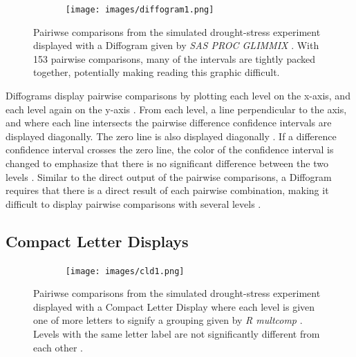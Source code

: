 \documentclass{article}
\begin{document}
\begin{figure}[H]
    \centering
    \texttt{[image: images/diffogram1.png]}
   \label{fig:compute}
    \caption{Pairiwse comparisons from the simulated drought-stress experiment displayed with a Diffogram given by \emph{SAS PROC GLIMMIX} \cite{procGlimmy}. With 153 pairwise comparisons, many of the intervals are tightly packed together, potentially making reading this graphic difficult.}
\end{figure}

Diffograms display pairwise comparisons by plotting each level on the x-axis, and each level again on the y-axis \cite{diffogramAndOtra,procGlimmy, procPLM}. From each level, a line perpendicular to the axis, and where each line intersects the pairwise difference confidence intervals are displayed diagonally. The zero line is also displayed diagonally \cite{diffogramAndOtra,procGlimmy, procPLM}. If a difference confidence interval crosses the zero line, the color of the confidence interval is changed to emphasize that there is no significant difference between the two levels \cite{diffogramAndOtra,procGlimmy, procPLM}. Similar to the direct output of the pairwise comparisons, a Diffogram requires that there is a direct result of each pairwise combination, making it difficult to display pairwise comparisons with several levels \cite{diffogramAndOtra,procGlimmy, procPLM}.

\subsection{Compact Letter Displays}

\begin{figure}[H]
    \centering
    \texttt{[image: images/cld1.png]}
   \label{fig:compute}
    \caption{Pairiwse comparisons from the simulated drought-stress experiment displayed with a Compact Letter Display where each level is given one of more letters to signify a grouping given by \emph{R multcomp} \cite{rmultcomp}. Levels with the same letter label are not significantly different from each other \cite{rmultcomp, CLDInvest, CLDVsLines}.}
\end{figure}
\end{document}
